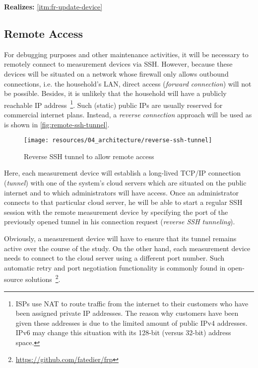 \textbf{Realizes:} \ref{itm:fr-update-device}


\subsection{Remote Access}

For debugging purposes and other maintenance activities, it will be necessary to remotely connect to measurement devices via \acs{SSH}. However, because these devices will be situated on a network whose firewall only allows outbound connections, i.e. the household's \acs{LAN}, direct access (\textit{forward connection}) will not be possible. Besides, it is unlikely that the household will have a publicly reachable \acs{IP} address~\footnote{\acsp{ISP} use \ac{NAT} to route traffic from the internet to their customers who have been assigned private \acs{IP} addresses. The reason why customers have been given these addresses is due to the limited amount of public \acs{IP}v4 addresses. \acs{IP}v6 may change this situation with its 128-bit (versus 32-bit) address space.}. Such (static) public \acsp{IP} are usually reserved for commercial internet plans. Instead, a \textit{reverse connection} approach will be used as is shown in \autoref{fig:remote-ssh-tunnel}.

\begin{figure}[hbt]
  \centering
  \texttt{[image: resources/04\_architecture/reverse-ssh-tunnel]}
  \caption{Reverse \acs{SSH} tunnel to allow remote access}
  \label{fig:remote-ssh-tunnel}
\end{figure}

\FloatBarrier

Here, each measurement device will establish a long-lived \acs{TCP}/\acs{IP} connection (\textit{tunnel}) with one of the system's cloud servers which are situated on the public internet and to which administrators will have access. Once an administrator connects to that particular cloud server, he will be able to start a regular \acs{SSH} session with the remote measurement device by specifying the port of the previously opened tunnel in his connection request (\textit{reverse \acs{SSH} tunneling}).

Obviously, a measurement device will have to ensure that its tunnel remains active over the course of the study. On the other hand, each measurement device needs to connect to the cloud server using a different port number. Such automatic retry and port negotiation functionality is commonly found in open-source solutions~\footnote{\url{https://github.com/fatedier/frp}}.

